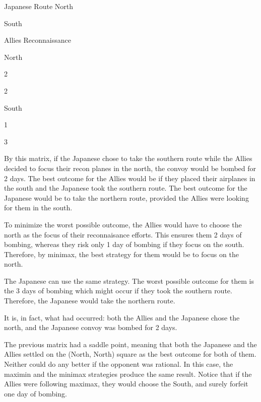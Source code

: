 Japanese Route
North

South

Allies Reconnaissance

North

2

2

South

1

3


By this matrix, if the Japanese chose to take the southern route while the Allies decided to focus their recon planes in the north, the convoy would be bombed for 2 days. The best outcome for the Allies would be if they placed their airplanes in the south and the Japanese took the southern route. The best outcome for the Japanese would be to take the northern route, provided the Allies were looking for them in the south.

To minimize the worst possible outcome, the Allies would have to choose the north as the focus of their reconnaisance efforts. This ensures them 2 days of bombing, whereas they risk only 1 day of bombing if they focus on the south. Therefore, by minimax, the best strategy for them would be to focus on the north.

The Japanese can use the same strategy. The worst possible outcome for them is the 3 days of bombing which might occur if they took the southern route. Therefore, the Japanese would take the northern route.

It is, in fact, what had occurred: both the Allies and the Japanese chose the north, and the Japanese convoy was bombed for 2 days.

The previous matrix had a saddle point, meaning that both the Japanese and the Allies settled on the (North, North) square as the best outcome for both of them. Neither could do any better if the opponent was rational. In this case, the maximin and the minimax strategies produce the same result. Notice that if the Allies were following maximax, they would choose the South, and surely forfeit one day of bombing.


